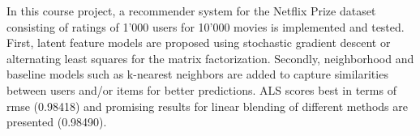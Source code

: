 In this course project, a recommender system for the Netflix Prize dataset
consisting of ratings of 1'000 users for 10'000 movies is implemented and tested. 
First, latent feature models are proposed using stochastic
gradient descent or alternating least squares for the matrix factorization. Secondly,
neighborhood and baseline models such as k-nearest neighbors are added to capture
similarities between users and/or items for better predictions. ALS scores best
in terms of rmse (0.98418) and promising results for linear blending of different
methods are presented (0.98490).
